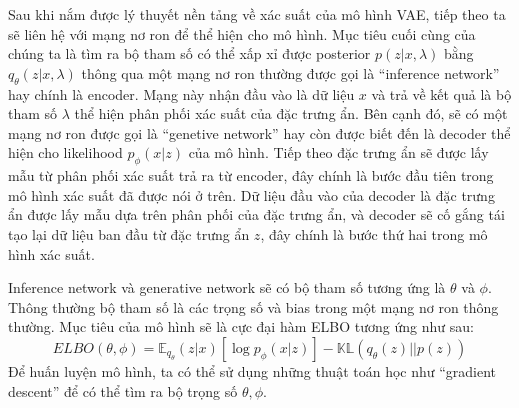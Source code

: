         
        Sau khi nắm được lý thuyết nền tảng về xác suất của mô hình VAE, tiếp theo ta sẽ liên hệ với mạng nơ ron để thể hiện cho mô hình.
        Mục tiêu cuối cùng của chúng ta là tìm ra bộ tham số có thể xấp xỉ được posterior $ p(z|x,\lambda)$ bằng $q_\theta(z|x,\lambda) $ thông qua một mạng nơ ron thường được gọi là  ``inference network'' hay chính là encoder. Mạng này nhận đầu vào là dữ liệu $x$ và trả về kết quả là bộ tham số $\lambda$ thể hiện phân phối xác suất của đặc trưng ẩn. 
        Bên cạnh đó, sẽ có một mạng nơ ron được gọi là ``genetive network'' hay còn được biết đến là decoder thể hiện cho likelihood $p_{\phi}(x|z)$ của mô hình. 
        Tiếp theo đặc trưng ẩn sẽ được lấy mẫu từ phân phối xác suất trả ra từ encoder, đây chính là bước đầu tiên trong mô hình xác suất đã được nói ở  trên.
        Dữ liệu đầu vào của decoder là đặc trưng ẩn được lấy mẫu dựa trên phân phối của đặc trưng ẩn, và decoder sẽ cố gắng tái tạo lại dữ liệu ban đầu từ đặc trưng ẩn $z$, đây chính là bước thứ hai trong mô hình xác suất.
        
        Inference network và generative network sẽ có bộ tham số tương ứng là $\theta$ và $\phi$.
        Thông thường bộ tham số là các trọng số và bias trong một mạng nơ ron thông thường. 
        Mục tiêu của mô hình sẽ là cực đại hàm ELBO tương ứng như sau:
        \begin{equation}
        \label{ELBO2}
            ELBO(\theta,\phi) = \mathbb{E}_{q_\theta}(z|x)[\log p_\phi(x|z)] - \mathbb{KL}(q_\theta(z)||p(z))
        \end{equation}
        Để huấn luyện mô hình, ta có thể sử dụng những thuật toán học như ``gradient descent'' để có thể tìm ra bộ trọng số $\theta,\phi$.